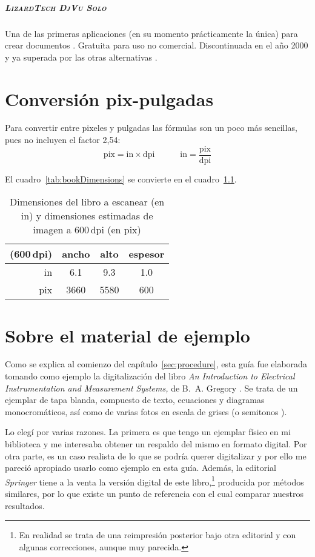 \documentclass[%
	a5paper,
	10pt,
	twoside,
	openright,
	final,
]{memoir}
\begin{document}
{	\paragraph{\textsc{LizardTech DjVu Solo}} Una de las primeras aplicaciones (en su momento prácticamente la única) para crear documentos \djvu. Gratuita para uso no comercial. Discontinuada en el año 2000 y ya superada por las otras alternativas \cite{DjVuSolo}.

	\chapter{Conversión pix-pulgadas\label{app:conversion}} Para convertir entre pixeles y pulgadas las fórmulas son un poco más sencillas, pues no incluyen el factor \mbox{2,54}:
	\[
		\text{pix} = \text{in} \times \text{dpi}\hspace{3em} \text{in} = \frac{\text{pix}}{\text{dpi}}
	\]

	El cuadro~\ref{tab:bookDimensions} se convierte en el cuadro~\ref{tab:bookDimensionsInches}.
	\begin{table}
		\centering
		\caption{Dimensiones del libro a escanear (en in) y dimensiones estimadas de imagen a 600\,dpi (en pix)\label{tab:bookDimensionsInches}}
		\begin{tabular}{rccc}
			\toprule
			(600\,dpi) & ancho & alto & espesor \\
			\midrule
			in  & 6.1 & 9.3 & 1.0 \\
			pix & 3660 & 5580 & 600 \\
			\bottomrule
		\end{tabular}
	\end{table}

	\chapter{Sobre el material de ejemplo\label{sec:aboutGregory}} Como se explica al comienzo del capítulo~\ref{sec:procedure}, esta guía fue elaborada tomando como ejemplo la digitalización del libro \emph{An Introduction to Electrical Instrumentation and Measurement Systems,} de B.~A. Gregory \cite{GregorySpringer}. Se trata de un ejemplar de tapa blanda, compuesto de texto, ecuaciones y diagramas monocromáticos, así como de varias fotos en escala de grises (o semitonos \cite{WikipediaHalftone}).

	Lo elegí por varias razones. La primera es que tengo un ejemplar físico en mi biblioteca y me interesaba obtener un respaldo del mismo en formato digital. Por otra parte, es un caso realista de lo que se podría querer digitalizar y por ello me pareció apropiado usarlo como ejemplo en esta guía. Además, la editorial \emph{Springer} tiene a la venta la versión digital de este libro,\footnote{En realidad se trata de una reimpresión posterior bajo otra editorial y con algunas correcciones, aunque muy parecida.} producida por métodos similares, por lo que existe un punto de referencia con el cual comparar nuestros resultados.

}
\end{document}

